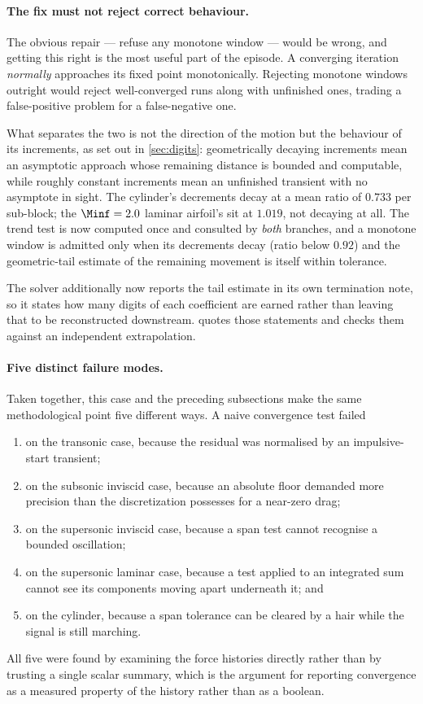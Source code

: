\paragraph{The fix must not reject correct behaviour.} The obvious repair --- refuse any
monotone window --- would be wrong, and getting this right is the most useful part of the
episode. A converging iteration \emph{normally} approaches its fixed point monotonically.
Rejecting monotone windows outright would reject well-converged runs along with
unfinished ones, trading a false-positive problem for a false-negative one.

What separates the two is not the direction of the motion but the behaviour of its
increments, as set out in \cref{sec:digits}: geometrically decaying increments mean an
asymptotic approach whose remaining distance is bounded and computable, while roughly
constant increments mean an unfinished transient with no asymptote in sight. The
cylinder's decrements decay at a mean ratio of $0.733$ per sub-block; the
$\Minf=2.0$ laminar airfoil's sit at $1.019$, not decaying at all. The trend test is
now computed once and consulted by \emph{both} branches, and a monotone window is
admitted only when its decrements decay (ratio below $0.92$) and the geometric-tail
estimate of the remaining movement is itself within tolerance.

The solver additionally now reports the tail estimate in its own termination note, so it
states how many digits of each coefficient are earned rather than leaving that to be
reconstructed downstream.  quotes those statements and checks them
against an independent extrapolation.

\paragraph{Five distinct failure modes.} Taken together, this case and the preceding
subsections make the same methodological point five different ways. A naive convergence
test failed
\begin{enumerate}
  \item on the transonic case, because the residual was normalised by an
  impulsive-start transient;
  \item on the subsonic inviscid case, because an absolute floor demanded more precision
  than the discretization possesses for a near-zero drag;
  \item on the supersonic inviscid case, because a span test cannot recognise a bounded
  oscillation;
  \item on the supersonic laminar case, because a test applied to an integrated sum
  cannot see its components moving apart underneath it; and
  \item on the cylinder, because a span tolerance can be cleared by a hair while the
  signal is still marching.
\end{enumerate}
All five were found by examining the force histories directly rather than by trusting a
single scalar summary, which is the argument for reporting convergence as a measured
property of the history rather than as a boolean.

